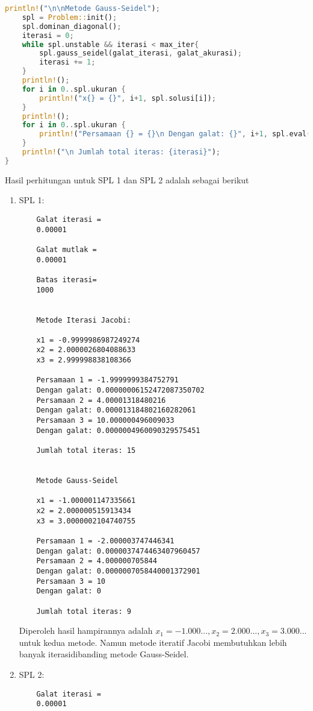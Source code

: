 \documentclass[12pt]{article}
\begin{document}
\begin{enumerate}
{\begin{lstlisting}[language=Rust, style=colouredRust, basicstyle=\fontsize{6.7pt}{8pt}\selectfont\color{white}\ttfamily]
    println!("\n\nMetode Gauss-Seidel");
    spl = Problem::init();
    spl.dominan_diagonal();
    iterasi = 0;
    while spl.unstable && iterasi < max_iter{
        spl.gauss_seidel(galat_iterasi, galat_akurasi);
        iterasi += 1;
    }
    println!();
    for i in 0..spl.ukuran {
        println!("x{} = {}", i+1, spl.solusi[i]);
    }
    println!();
    for i in 0..spl.ukuran {
        println!("Persamaan {} = {}\n Dengan galat: {}", i+1, spl.eval(i), (spl.eval(i) - spl.konstan[i]).abs());
    }
    println!("\n Jumlah total iteras: {iterasi}");
}
        \end{lstlisting}
        Hasil perhitungan untuk SPL 1 dan SPL 2 adalah sebagai berikut
        \begin{enumerate}
            \item {
                SPL 1:
                \begin{lstlisting}
    Galat iterasi = 
    0.00001

    Galat mutlak = 
    0.00001

    Batas iterasi= 
    1000


    Metode Iterasi Jacobi:

    x1 = -0.9999986987249274
    x2 = 2.0000026804088633
    x3 = 2.999998838108366

    Persamaan 1 = -1.9999999384752791
    Dengan galat: 0.00000006152472087350702
    Persamaan 2 = 4.00001318480216
    Dengan galat: 0.000013184802160282061
    Persamaan 3 = 10.000000496009033
    Dengan galat: 0.0000004960090329575451

    Jumlah total iteras: 15


    Metode Gauss-Seidel

    x1 = -1.000001147335661
    x2 = 2.000000515913434
    x3 = 3.0000002104740755

    Persamaan 1 = -2.000003747446341
    Dengan galat: 0.0000037474463407960457
    Persamaan 2 = 4.000000705844
    Dengan galat: 0.0000007058440001372901
    Persamaan 3 = 10
    Dengan galat: 0

    Jumlah total iteras: 9
                \end{lstlisting}
                Diperoleh hasil hampirannya adalah $ x_1 = -1.000..., x_2 = 2.000..., x_3 = 3.000... $ untuk kedua metode. Namun metode iteratif Jacobi membutuhkan lebih banyak iterasidibanding metode Gauss-Seidel.
            }
            \item {
                SPL 2:
                \begin{lstlisting}
    Galat iterasi =
    0.00001


\end{lstlisting}}
\end{enumerate}}
\end{enumerate}
\end{document}
